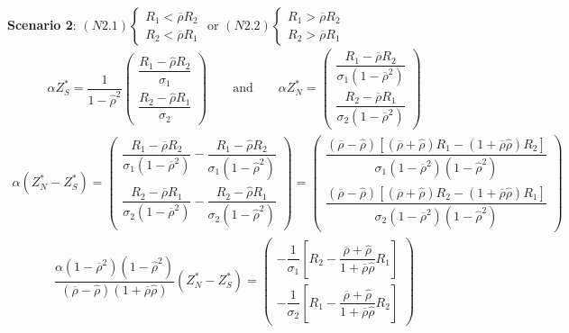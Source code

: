 \documentclass[10pt]{article}
\begin{document}
{\bf Scenario 2}: $ (N2.1) \left\{ \begin{matrix} R_1 < \overline{\rho} R_2 \\ R_2 < \overline{\rho} R_1 \end{matrix} \right. $ or $ (N2.2) \left\{ \begin{matrix} R_1 > \overline{\rho} R_2 \\ R_2 > \overline{\rho} R_1 \end{matrix} \right. $
\begin{eqnarray*}
\alpha Z_S^* = \dfrac1{1 - {\hat \rho}^2} \left( \begin{matrix} \dfrac{R_1 - {\hat \rho} R_2}{\sigma_1} \\ \dfrac{R_2 - {\hat \rho} R_1}{\sigma_2} \end{matrix} \right) \qquad \text{and} \qquad \alpha Z_N^* = \left( \begin{matrix} \dfrac{R_1 - \overline{\rho} R_2}{\sigma_1 (1 - \overline{\rho}^2)} \\ \dfrac{R_2 - \overline{\rho} R_1}{\sigma_2 (1 - \overline{\rho}^2)} \end{matrix} \right)
\end{eqnarray*}
\begin{eqnarray*}
\alpha (Z_N^* - Z_S^*) = \left( \begin{matrix} \dfrac{R_1 - \overline{\rho} R_2}{\sigma_1 (1 - \overline{\rho}^2)} - \dfrac{R_1 - {\hat \rho} R_2}{\sigma_1 (1 - {\hat \rho}^2)} \\ \dfrac{R_2 - \overline{\rho} R_1}{\sigma_2 (1 - \overline{\rho}^2)} - \dfrac{R_2 - {\hat \rho} R_1}{\sigma_2 (1 - {\hat \rho}^2)} \end{matrix} \right) = \left( \begin{matrix} \dfrac{(\overline{\rho} - {\hat \rho}) [(\overline{\rho} + {\hat \rho}) R_1 - (1 + \overline{\rho} {\hat \rho}) R_2]}{\sigma_1 (1 - \overline{\rho}^2) (1 - {\hat \rho}^2)} \\ \dfrac{(\overline{\rho} - {\hat \rho}) [(\overline{\rho} + {\hat \rho}) R_2 - (1 + \overline{\rho} {\hat \rho}) R_1]}{\sigma_2 (1 - \overline{\rho}^2) (1 - {\hat \rho}^2)} \end{matrix} \right)
\end{eqnarray*}
\begin{eqnarray*}
\dfrac{\alpha (1 - \overline{\rho}^2) (1 - {\hat \rho}^2)}{(\overline{\rho} - {\hat \rho}) (1 + \overline{\rho} {\hat \rho})} (Z_N^* - Z_S^*) = \left( \begin{matrix} - \dfrac{1}{\sigma_1} \left[ R_2 - \dfrac{\overline{\rho} + {\hat \rho}}{1 + \overline{\rho} {\hat \rho}} R_1 \right] \\ - \dfrac{1}{\sigma_2} \left[ R_1 - \dfrac{\overline{\rho} + {\hat \rho}}{1 + \overline{\rho} {\hat \rho}} R_2 \right] \end{matrix} \right)
\end{eqnarray*}
\end{document}
